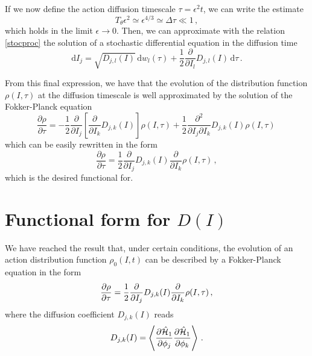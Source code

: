 If we now define the action diffusion timescale $\tau=\epsilon^2 t$, we can write the estimate 
\begin{equation}
    T_\theta \epsilon^2\simeq \epsilon^{4/3}\simeq \Delta \tau\ll 1 \,,
\end{equation}
which holds in the limit $\epsilon\to 0$. Then, we can approximate with the relation \eqref{stocproc} the solution of a stochastic differential equation in the diffusion time
\begin{equation}
    \mathrm{d}I_j=\sqrt{D_{j,l}(I)}\,\mathrm{d}w_l(\tau)+
    \frac{1}{2} \frac{\partial}{\partial I_l}D_{j,l}(I) \,\mathrm{d}\tau \,.
    \label{stocaction}
\end{equation}

From this final expression, we have that the evolution of the distribution function $\rho(I,\tau)$ at the diffusion timescale is well approximated by the solution of the Fokker-Planck equation
\begin{equation}
    \frac{\partial \rho}{\partial \tau}=- \frac{1}{2} \frac{\partial }{\partial I_j}
    \left [\frac{\partial}{\partial I_k}D_{j,k}(I) \right ]\rho(I,\tau)
    +\frac{1}{2}\frac{\partial^2}{\partial I_j\partial I_k}D_{j,k}(I)\rho(I,\tau)\,
\end{equation}
which can be easily rewritten in the form
\begin{equation}
    \frac{\partial \rho}{\partial \tau}=
    \frac{1}{2}\frac{\partial}{\partial I_j}D_{j,k}(I)
    \frac{\partial}{\partial I_k}\rho(I,\tau) \,,
    \label{fokker1}
\end{equation}
which is the desired functional for.

\section{Functional form for $D(I)$}\label{sec:diff:functional_form}

We have reached the result that, under certain conditions, the evolution of an action distribution function $\rho_0(I, t)$ can be described by a Fokker-Planck equation in the form
\begin{equation}
    \pdv{\rho}{\tau}=\frac{1}{2}\pdv{}{I_j} D_{j,k}(I) \pdv{}{I_k}\rho(I,\tau)\,,
    \label{eq:final-fp}
\end{equation} 
where the diffusion coefficient $D_{j,k}(I)$ reads
\begin{equation}
    D_{j,k}(I) = \left\langle\pdv{\hat{\mathcal{H}}_1}{\phi_j}\pdv{\hat{\mathcal{H}}_1}{\phi_k}\right\rangle \,.
\end{equation}

